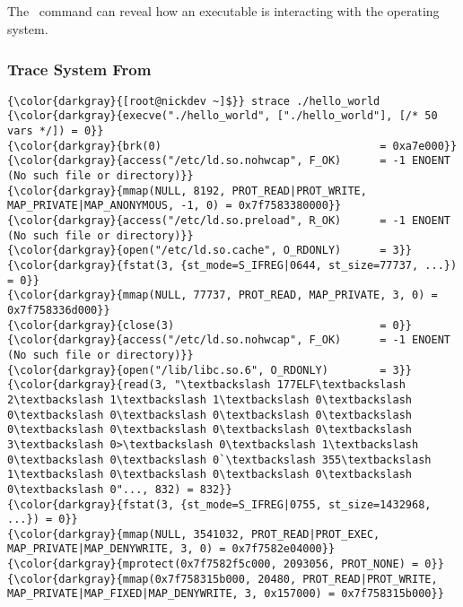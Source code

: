 % 

\subsection{\strace}
\label{sec:strace}
The \strace \ command can reveal how an executable is interacting with the operating system.

		\subsubsection{Trace System From \href{https://web.archive.org/web/20230101034530/https://aws-labs.com/strace-lsof-track-process-hangs/}{}}
{\footnotesize{
\begin{Verbatim}[commandchars=\\\{\}]
{\color{darkgray}{[root@nickdev ~]$}} strace ./hello_world 
{\color{darkgray}{execve("./hello_world", ["./hello_world"], [/* 50 vars */]) = 0}}
{\color{darkgray}{brk(0)                                  = 0xa7e000}}
{\color{darkgray}{access("/etc/ld.so.nohwcap", F_OK)      = -1 ENOENT (No such file or directory)}}
{\color{darkgray}{mmap(NULL, 8192, PROT_READ|PROT_WRITE, MAP_PRIVATE|MAP_ANONYMOUS, -1, 0) = 0x7f7583380000}}
{\color{darkgray}{access("/etc/ld.so.preload", R_OK)      = -1 ENOENT (No such file or directory)}}
{\color{darkgray}{open("/etc/ld.so.cache", O_RDONLY)      = 3}}
{\color{darkgray}{fstat(3, {st_mode=S_IFREG|0644, st_size=77737, ...}) = 0}}
{\color{darkgray}{mmap(NULL, 77737, PROT_READ, MAP_PRIVATE, 3, 0) = 0x7f758336d000}}
{\color{darkgray}{close(3)                                = 0}}
{\color{darkgray}{access("/etc/ld.so.nohwcap", F_OK)      = -1 ENOENT (No such file or directory)}}
{\color{darkgray}{open("/lib/libc.so.6", O_RDONLY)        = 3}}
{\color{darkgray}{read(3, "\textbackslash 177ELF\textbackslash 2\textbackslash 1\textbackslash 1\textbackslash 0\textbackslash 0\textbackslash 0\textbackslash 0\textbackslash 0\textbackslash 0\textbackslash 0\textbackslash 0\textbackslash 0\textbackslash 3\textbackslash 0>\textbackslash 0\textbackslash 1\textbackslash 0\textbackslash 0\textbackslash 0`\textbackslash 355\textbackslash 1\textbackslash 0\textbackslash 0\textbackslash 0\textbackslash 0\textbackslash 0"..., 832) = 832}}
{\color{darkgray}{fstat(3, {st_mode=S_IFREG|0755, st_size=1432968, ...}) = 0}}
{\color{darkgray}{mmap(NULL, 3541032, PROT_READ|PROT_EXEC, MAP_PRIVATE|MAP_DENYWRITE, 3, 0) = 0x7f7582e04000}}
{\color{darkgray}{mprotect(0x7f7582f5c000, 2093056, PROT_NONE) = 0}}
{\color{darkgray}{mmap(0x7f758315b000, 20480, PROT_READ|PROT_WRITE, MAP_PRIVATE|MAP_FIXED|MAP_DENYWRITE, 3, 0x157000) = 0x7f758315b000}}

\end{Verbatim}}}
